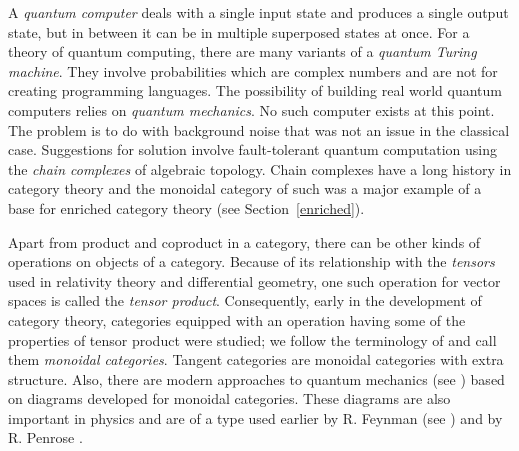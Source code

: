 \documentclass[a4paper,12pt]{article}
\theoremstyle{step}
\begin{document}
A {\em quantum computer} deals with a single input state and produces a single output state, but in between it can be in multiple superposed states at once. For a theory of quantum computing, there are many variants of a {\em quantum Turing machine}. They involve probabilities which are complex numbers and are not for creating programming languages. The possibility of building real world quantum computers relies on {\em quantum mechanics}. No such computer exists at this point. The problem is to do with background noise
that was not an issue in the classical case. Suggestions for solution involve fault-tolerant quantum computation \cite{LiWil, Kit} using the {\em chain complexes} of algebraic topology.
Chain complexes have a long history in category theory and the monoidal category of such was a major example of a base for enriched category theory (see Section~\ref{enriched}).

Apart from product and coproduct in a category, there can be other kinds of operations on objects of
a category. Because of its relationship with the {\em tensors} used in relativity theory and differential
geometry, one such operation for vector spaces is called the {\em tensor product}. Consequently,
early in the development of category theory, categories equipped with an operation having some of
the properties of tensor product were studied; we follow the terminology of \cite{EilKel1966} and call
them {\em monoidal categories}. Tangent categories are monoidal categories with extra structure.
Also, there are modern approaches to quantum mechanics (see \cite{CoeGog}) based on diagrams developed for monoidal categories. These diagrams are also important in physics and are of a type used earlier by R. Feynman (see \cite{BaeDol2}) and by R. Penrose \cite{Pen1971}.       
\end{document}
